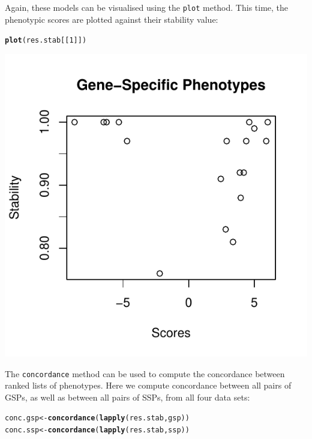 \documentclass{article}\usepackage[]{graphicx}\usepackage[]{color}
\makeatletter
\newcommand{\hlnum}[1]{\textcolor[rgb]{0.686,0.059,0.569}{#1}}%
\newcommand{\hlstd}[1]{\textcolor[rgb]{0.345,0.345,0.345}{#1}}%
\newcommand{\hlkwb}[1]{\textcolor[rgb]{0.69,0.353,0.396}{#1}}%
\newcommand{\hlkwd}[1]{\textcolor[rgb]{0.737,0.353,0.396}{\textbf{#1}}}%
\newenvironment{kframe}{%
 \def\at@end@of@kframe{}%
 \ifinner\ifhmode%
  \def\at@end@of@kframe{\end{minipage}}%
  \begin{minipage}{\columnwidth}%
 \fi\fi%
 \def\FrameCommand##1{\hskip\@totalleftmargin \hskip-\fboxsep
 \colorbox{shadecolor}{##1}\hskip-\fboxsep
     \hskip-\linewidth \hskip-\@totalleftmargin \hskip\columnwidth}%
 \MakeFramed {\advance\hsize-\width
   \@totalleftmargin\z@ \linewidth\hsize
   \@setminipage}}%
 {\par\unskip\endMakeFramed%
 \at@end@of@kframe}
\newenvironment{knitrout}{}{} %
\makeatother
\begin{document}
Again, these models can be visualised using the \texttt{plot} method. This time, the phenotypic scores are plotted against their stability value:
\begin{knitrout}
\color{fgcolor}\begin{kframe}
\begin{alltt}
  \hlkwd{plot}\hlstd{(res.stab[[}\hlnum{1}\hlstd{]])}
\end{alltt}
\end{kframe}

{\centering \includegraphics[width=.75\textwidth]{tmp/gespeR-plot_stability-1} 

}



\end{knitrout}

The \texttt{concordance} method can be used to compute the concordance between ranked lists of phenotypes. Here we compute concordance between all pairs of GSPs, as well as between all pairs of SSPs, from all four data sets:
\begin{knitrout}
\color{fgcolor}\begin{kframe}
\begin{alltt}
  \hlstd{conc.gsp} \hlkwb{<-} \hlkwd{concordance}\hlstd{(}\hlkwd{lapply}\hlstd{(res.stab, gsp))}
  \hlstd{conc.ssp} \hlkwb{<-} \hlkwd{concordance}\hlstd{(}\hlkwd{lapply}\hlstd{(res.stab, ssp))}
\end{alltt}
\end{kframe}
\end{knitrout}
\end{document}
